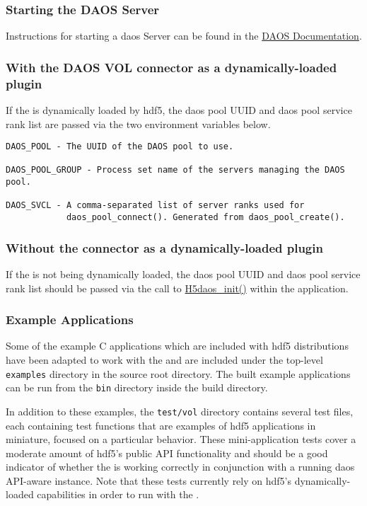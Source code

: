 \documentclass[../users_guide.tex]{subfiles}
\begin{document}
\subsubsection{Starting the DAOS Server}
\label{sec:daos_serv_start}

Instructions for starting a \acrshort{daos} Server can be found in the \href{https://daos-stack.github.io/admin/deployment/#server-startup}{DAOS Documentation}.

\subsubsection{With the DAOS VOL connector as a dynamically-loaded plugin}

If the \dvc{} is dynamically loaded by \acrshort{hdf5}, the \acrshort{daos} pool UUID and
\acrshort{daos} pool service rank list are passed via the two environment variables below.

\begin{verbatim}
DAOS_POOL - The UUID of the DAOS pool to use.

DAOS_POOL_GROUP - Process set name of the servers managing the DAOS pool.

DAOS_SVCL - A comma-separated list of server ranks used for
            daos_pool_connect(). Generated from daos_pool_create().
\end{verbatim}

\subsubsection{Without the connector as a dynamically-loaded plugin}

If the \dvc{} is not being dynamically loaded, the \acrshort{daos} pool UUID
and \acrshort{daos} pool service rank list should be passed via the call to
\hyperref[ref:h5daos_init]{H5daos\_init()} within the application.

\subsubsection{Example Applications}

Some of the example C applications which are included with \acrshort{hdf5}
distributions have been adapted to work with the \dvc{} and are included under
the top-level \texttt{examples} directory in the \dvc{} source root directory.
The built example applications can be run from the \texttt{bin} directory inside the build directory.

In addition to these examples, the \texttt{test/vol} directory contains several test
files, each containing test functions that are examples of \acrshort{hdf5} applications in
miniature, focused on a particular behavior. These mini-application tests cover a moderate 
amount of \acrshort{hdf5}'s public API functionality and should be a good indicator of
whether the \dvc{} is working correctly in conjunction with a
running \acrshort{daos} API-aware instance. Note that these tests currently rely on \acrshort{hdf5}'s
dynamically-loaded \vc{} capabilities in order to run with the \dvc{}.
\end{document}
